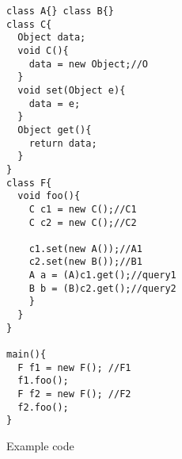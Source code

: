 
\begin{figure}
	\centering

	\begin{multicols}{2}
\begin{subfigure}[t]{1.5\columnwidth}
	\begin{multicols}{2}
		\begin{lstlisting}[basicstyle=\small\ttfamily]
class A{} class B{}
class C{
  Object data;
  void C(){
    data = new Object;//O
  }
  void set(Object e){
    data = e;
  }
  Object get(){
    return data;
  }
}
class F{
  void foo(){
    C c1 = new C();//C1
    C c2 = new C();//C2

    c1.set(new A());//A1
    c2.set(new B());//B1
    A a = (A)c1.get();//query1
    B b = (B)c2.get();//query2
    }
  }
}

main(){
  F f1 = new F(); //F1
  f1.foo();
  F f2 = new F(); //F2
  f2.foo();
}

\end{lstlisting}
\end{multicols}
\caption{Example code}
\label{fig:example}
\end{subfigure}
\begin{flushright}
\begin{subfigure}[t]{0.6\columnwidth}	
	\begin{center}
\end{center}
\end{subfigure}
\end{flushright}
\end{multicols}
\end{figure}
